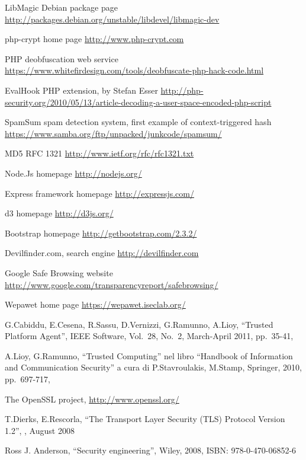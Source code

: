 \begin{thebibliography}{99}
LibMagic Debian package page
\url{http://packages.debian.org/unstable/libdevel/libmagic-dev}

php-crypt home page
\url{http://www.php-crypt.com}

PHP deobfuscation web service
\url{https://www.whitefirdesign.com/tools/deobfuscate-php-hack-code.html}

EvalHook PHP extension, by Stefan Esser
\url{http://php-security.org/2010/05/13/article-decoding-a-user-space-encoded-php-script}

SpamSum spam detection system, first example of context-triggered hash
\url{https://www.samba.org/ftp/unpacked/junkcode/spamsum/}

MD5 RFC 1321
\url{http://www.ietf.org/rfc/rfc1321.txt}

Node.Js homepage
\url{http://nodejs.org/}

Express framework homepage
\url{http://expressjs.com/}

d3 homepage
\url{http://d3js.org/}

Bootstrap homepage
\url{http://getbootstrap.com/2.3.2/}

Devilfinder.com, search engine
\url{http://devilfinder.com}

Google Safe Browsing website
\url{http://www.google.com/transparencyreport/safebrowsing/}

Wepawet home page
\url{https://wepawet.iseclab.org/}

G.Cabiddu, E.Cesena, R.Sassu, D.Vernizzi, G.Ramunno, A.Lioy,  %
``Trusted Platform Agent'', %
IEEE Software, %
Vol.\ 28, No.\ 2, %
March-April 2011, %
pp.\ 35-41, %


A.Lioy, G.Ramunno, %
``Trusted Computing'' %
nel libro %
``Handbook of Information and Communication Security'' %
a cura di %
P.Stavroulakis, M.Stamp, %
Springer, %
2010, %
pp.\ 697-717, %

The OpenSSL project, %
\url{http://www.openssl.org/} %

T.Dierks, E.Rescorla,
``The Transport Layer Security (TLS) Protocol Version 1.2'',
, August 2008

Ross J. Anderson,
``Security engineering'',
Wiley, 2008,
ISBN: 978-0-470-06852-6


\end{thebibliography}
